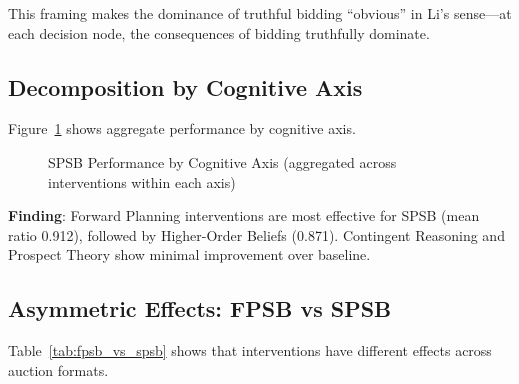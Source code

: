 \documentclass[12pt]{article}
\begin{document}
This framing makes the dominance of truthful bidding ``obvious'' in Li's sense---at each decision node, the consequences of bidding truthfully dominate.

\subsection{Decomposition by Cognitive Axis}

Figure~\ref{fig:axis_comparison} shows aggregate performance by cognitive axis.

\begin{figure}[h]
\centering
{}
\caption{SPSB Performance by Cognitive Axis (aggregated across interventions within each axis)}
\label{fig:axis_comparison}
\end{figure}

\textbf{Finding}: Forward Planning interventions are most effective for SPSB (mean ratio 0.912), followed by Higher-Order Beliefs (0.871). Contingent Reasoning and Prospect Theory show minimal improvement over baseline.

\subsection{Asymmetric Effects: FPSB vs SPSB}

Table~\ref{tab:fpsb_vs_spsb} shows that interventions have different effects across auction formats.
\end{document}
